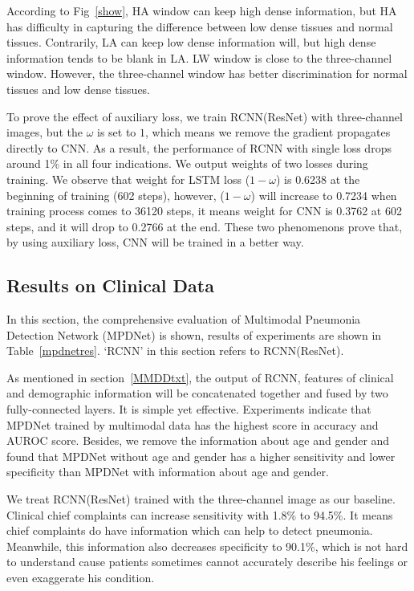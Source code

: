 \documentclass[journal]{IEEEtran}
\begin{document}
According to Fig~\ref{show}, HA window can keep high dense information, but HA has difficulty in capturing the difference between low dense tissues and normal tissues. Contrarily, LA can keep low dense information will, but high dense information tends to be blank in LA. LW window is close to the three-channel window. However, the three-channel window has better discrimination for normal tissues and low dense tissues.

To prove the effect of auxiliary loss, we train RCNN(ResNet) with three-channel images, but the $\omega$ is set to $1$, which means we remove the gradient propagates directly to CNN.
As a result, the performance of RCNN with single loss drops around 1\% in all four indications. We output weights of two losses during training. We observe that weight for LSTM loss ($1 - \omega$) is 0.6238 at the beginning of training (602 steps), however, ($1 - \omega$) will increase to 0.7234 when training process comes to 36120 steps, it means weight for CNN is 0.3762 at 602 steps, and it will drop to 0.2766 at the end. 
These two phenomenons prove that, by using auxiliary loss, CNN will be trained in a better way. 


\subsection{Results on Clinical Data}
\label{results}
  
In this section, the comprehensive evaluation of Multimodal Pneumonia Detection Network (MPDNet) is shown, results of experiments are shown in Table~\ref{mpdnetres}. `RCNN' in this section refers to RCNN(ResNet).

As mentioned in section~\ref{MMDDtxt}, the output of RCNN, features of clinical and demographic information will be concatenated together and fused by two fully-connected layers. It is simple yet effective. Experiments indicate that MPDNet trained by multimodal data has the highest score in accuracy and AUROC score. 
Besides, we remove the information about age and gender and found that MPDNet without age and gender has a higher sensitivity and lower specificity than MPDNet with information about age and gender. 
    
We treat RCNN(ResNet) trained with the three-channel image as our baseline. Clinical chief complaints can increase sensitivity with 1.8\% to 94.5\%. It means chief complaints do have information which can help to detect pneumonia. Meanwhile, this information also decreases specificity to 90.1\%, which is not hard to understand cause patients sometimes cannot accurately describe his feelings or even exaggerate his condition. 
\end{document}
